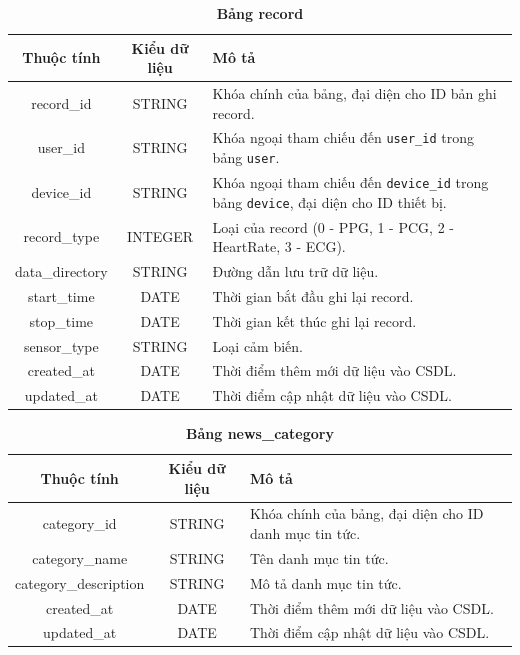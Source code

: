 \begin{table}[H]
  \caption{\bfseries \fontsize{12pt}{0pt}\selectfont Bảng record}
  \centering
  \begin{tabularx}{0.9\textwidth}{|c|c|X|}
    \hline
    \textbf{Thuộc tính} & \textbf{Kiểu dữ liệu} & \textbf{Mô tả} \\
    \hline
    record\_id & STRING & Khóa chính của bảng, đại diện cho ID bản ghi record. \\
    \hline
    user\_id & STRING & Khóa ngoại tham chiếu đến \texttt{user\_id} trong bảng \texttt{user}. \\
    \hline
    device\_id & STRING & Khóa ngoại tham chiếu đến \texttt{device\_id} trong bảng \texttt{device}, đại diện cho ID thiết bị. \\
    \hline
    record\_type & INTEGER & Loại của record (0 - PPG, 1 - PCG, 2 - HeartRate, 3 - ECG). \\
    \hline
    data\_directory & STRING & Đường dẫn lưu trữ dữ liệu. \\
    \hline
    start\_time & DATE & Thời gian bắt đầu ghi lại record. \\
    \hline
    stop\_time & DATE & Thời gian kết thúc ghi lại record. \\
    \hline
    sensor\_type & STRING & Loại cảm biến. \\
    \hline
    created\_at & DATE & Thời điểm thêm mới dữ liệu vào CSDL. \\
    \hline
    updated\_at & DATE & Thời điểm cập nhật dữ liệu vào CSDL. \\
    \hline
  \end{tabularx}
\end{table}

\begin{table}[H]
  \caption{\bfseries \fontsize{12pt}{0pt}\selectfont Bảng news\_category}
  \centering
  \begin{tabularx}{0.9\textwidth}{|c|c|X|}
    \hline
    \textbf{Thuộc tính} & \textbf{Kiểu dữ liệu} & \textbf{Mô tả} \\
    \hline
    category\_id & STRING & Khóa chính của bảng, đại diện cho ID danh mục tin tức. \\
    \hline
    category\_name & STRING & Tên danh mục tin tức. \\
    \hline
    category\_description & STRING & Mô tả danh mục tin tức. \\
    \hline
    created\_at & DATE & Thời điểm thêm mới dữ liệu vào CSDL. \\
    \hline
    updated\_at & DATE & Thời điểm cập nhật dữ liệu vào CSDL. \\
    \hline
  \end{tabularx}
\end{table}

